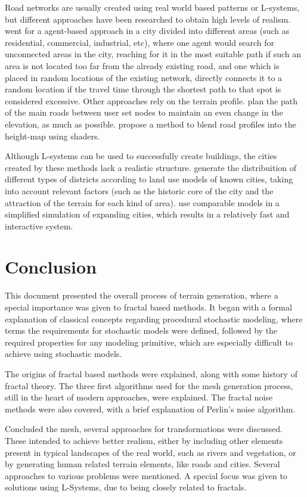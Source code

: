 \documentclass{acmtog}
\begin{document}
Road networks are usually created using real world based patterns or L-systems, but different approaches have been researched to obtain high levels of realism. \cite{Lechner03} went for a agent-based approach in a city divided into different areas (such as residential, commercial, industrial, etc), where one agent would search for unconnected areas in the city, reaching for it in the most suitable path if such an area is not located too far from the already existing road, and one which is placed in random locations of the existing network, directly connects it to a random location if the travel time through the shortest path to that spot is considered excessive. Other approaches rely on the terrain profile. \cite{Kelly07} plan the path of the main roads between user set nodes to maintain an even change in the elevation, as much as possible. \cite{Bruneton08} propose a method to blend road profiles into the height-map using shaders.

Although L-systems can be used to successfully create buildings, the cities created by these methods lack a realistic structure. \cite{Groenewegen09} generate the distribuition of different types of districts according to land use models of known cities, taking into account relevant factors (such as the historic core of the city and the attraction of the terrain for each kind of area). \cite{Weber09} use comparable models in a simplified simulation of expanding cities, which results in a relatively fast and interactive system.

\section{Conclusion}
This document presented the overall process of terrain generation, where a special importance was given to fractal based methods. It began with a formal explanation of classical concepts regarding procedural stochastic modeling, where terms the requirements for stochastic models were defined, followed by the required properties for any modeling primitive, which are especially difficult to achieve using stochastic models.

The origins of fractal based methods were explained, along with some history of fractal theory. The three first algorithms used for the mesh generation process, still in the heart of modern approaches, were explained. The fractal noise methods were also covered, with a brief explanation of Perlin's noise algorithm.

Concluded the mesh, several approaches for transformations were discussed. These intended to achieve better realism, either by including other elements present in typical landscapes of the real world, such as rivers and vegetation, or by generating human related terrain elements, like roads and cities. Several approaches to various problems were mentioned. A special focus was given to solutions using L-Systems, due to being closely related to fractals.
\end{document}
